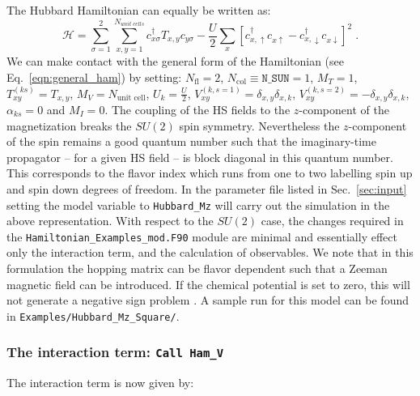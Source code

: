 The Hubbard Hamiltonian can equally be written as:
\begin{equation}
\label{eqn_hubbard_Mz}
\mathcal{H}=
\sum\limits_{\sigma=1}^{2} 
\sum\limits_{x,y =1 }^{N_{unit\; cells }} 
  c^{\dagger}_{x \sigma} T_{x,y}c^{\phantom\dagger}_{y \sigma} 
- \frac{U}{2}\sum\limits_{x}\left[
c^{\dagger}_{x, \uparrow} c^{\phantom\dagger}_{x \uparrow}  -   c^{\dagger}_{x, \downarrow} c^{\phantom\dagger}_{x \downarrow}  \right]^{2}\;.
\end{equation} 
We can make contact with the general form of the Hamiltonian  (see Eq.~\ref{eqn:general_ham}) by setting: 
$N_{\mathrm{fl}} = 2$, $N_{\mathrm{col}} \equiv \texttt{N\_SUN}     =1 $,   $M_T    =    1$,  $T^{(ks)}_{x y}   =  T_{x,y}$,  $M_V   =  N_{\text{unit cell}} $,  $U_{k}       =   \frac{U}{2}$, 
 $V_{x y}^{(k, s=1)} =  \delta_{x,y} \delta_{x,k}  $,  $V_{x y}^{(k, s=2)} =  - \delta_{x,y} \delta_{x,k}  $,  $\alpha_{ks}   = 0  $ and $M_I       = 0 $.   
 The coupling of the HS fields to the $z$-component of   the magnetization breaks the $SU(2)$ spin symmetry. Nevertheless the $z$-component of the spin remains a good quantum number such that the imaginary-time propagator -- for a given HS field -- is block  diagonal in this quantum number. This corresponds to the flavor index  which runs from one to two  labelling spin up and spin down  degrees of freedom.       In the parameter file  listed in  Sec.~\ref{sec:input}  setting the model variable to  \texttt{Hubbard\_Mz}  will carry out the simulation in the above representation. 
 With respect to the $SU(2)$ case, the changes required in the \texttt{Hamiltonian\_Examples\_mod.F90}  module are  minimal and essentially effect only the interaction term, and the calculation of observables.  We note that  in this formulation the  hopping matrix can be flavor dependent such that a Zeeman  magnetic field can be introduced.  If the chemical potential is set to zero, this will not generate a negative sign problem \cite{Wu04,Milat04,Bercx09}.    
 A sample run for this model can be found in \texttt{Examples/Hubbard\_Mz\_Square/}.

\subsubsection{The interaction term: \texttt{Call Ham\_V} } 
The interaction term is now given by: 

